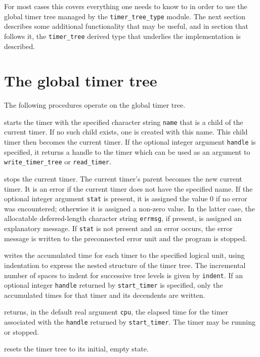 \documentclass[11pt]{article}
\begin{document}
For most cases this covers everything one needs to know to in order to use
the global timer tree managed by the \texttt{timer_tree_type} module.  The
next section describes some additional functionality that may be useful,
and in section that follows it, the \texttt{timer_tree} derived type that
underlies the implementation is described.

\section{The global timer tree}
The following procedures operate on the global timer tree.

\begin{description}[style=nextline]\setlength{\itemsep}{0pt}
\item[\texttt{call start_timer (name [,handle])}]
  starts the timer with the specified character string \texttt{name} that is
  a child of the current timer.  If no such child exists, one is created with
  this name.  This child timer then becomes the current timer. If the optional
  integer argument \texttt{handle} is specified, it returns a handle to
  the timer which can be used as an argument to \texttt{write_timer_tree}
  or \texttt{read_timer}.
\item[\texttt{call stop_timer (name [,stat [,errmsg]])}]
  stops the current timer.  The current timer's parent becomes the new
  current timer.  It is an error if the current timer does not
  have the specified name.  If the optional integer argument \texttt{stat}
  is present, it is assigned the value 0 if no error was encountered;
  otherwise it is assigned a non-zero value.  In the latter case, the
  allocatable deferred-length character string \texttt{errmsg}, if present,
  is assigned an explanatory message.  If \texttt{stat} is not present and
  an error occurs, the error message is written to the preconnected error
  unit and the program is stopped.
\item[\texttt{call write_timer_tree (unit, indent [,handle])}]
  writes the accumulated time for each timer to the specified logical unit,
  using indentation to express the nested structure of the timer tree.  The
  incremental number of spaces to indent for successive tree levels is given
  by \texttt{indent}.  If an optional integer \texttt{handle} returned by
  \texttt{start_timer} is specified, only the accumulated times for that
  timer and its decendents are written.
\item[\texttt{call read_timer (handle, cpu)}]
  returns, in the default real argument \texttt{cpu}, the elapsed time for
  the timer associated with the \texttt{handle} returned by
  \texttt{start_timer}.  The timer may be running or stopped.
\item[\texttt{call reset_timer_tree}]
  resets the timer tree to its initial, empty state.
\end{description}
\end{document}
